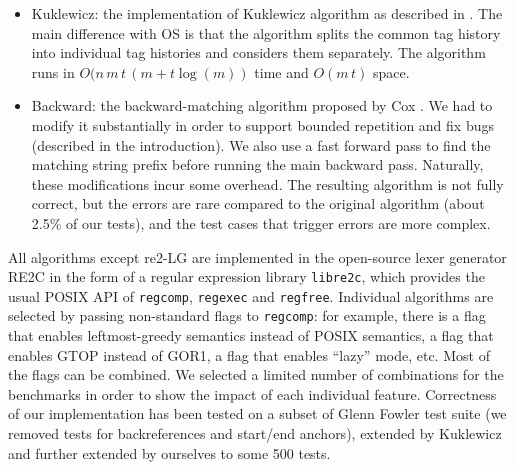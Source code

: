\documentclass[AMA,STIX1COL]{WileyNJD-v2}
\begin{document}
\begin{itemize}[itemsep=0.2em, topsep=0.5em]
\item Kuklewicz: the implementation of Kuklewicz algorithm \cite{Kuk07} as described in \cite{Tro17}.
    The main difference with OS is that the algorithm splits the common tag history into individual tag histories and considers them separately.
    The algorithm runs in $O(n \, m \, t \, (m + t \log(m))$ time and $O(m \, t)$ space.

\item Backward: the backward-matching algorithm proposed by Cox \cite{Cox09}.
    We had to modify it substantially in order to support bounded repetition and fix bugs (described in the introduction).
    We also use a fast forward pass to find the matching string prefix before running the main backward pass.
    Naturally, these modifications incur some overhead.
    The resulting algorithm is not fully correct, but the errors are rare compared to the original algorithm (about 2.5\% of our tests),
    and the test cases that trigger errors are more complex.
\\[-0.5em]
\end{itemize}

All algorithms except re2-LG are implemented in the open-source lexer generator RE2C \cite{RE2C}
in the form of a regular expression library \texttt{libre2c},
which provides the usual POSIX API of \texttt{regcomp}, \texttt{regexec} and \texttt{regfree}.
Individual algorithms are selected by passing non-standard flags to \texttt{regcomp}:
for example, there is a flag that enables leftmost-greedy semantics instead of POSIX semantics,
a flag that enables GTOP instead of GOR1,
a flag that enables ``lazy'' mode, etc.
Most of the flags can be combined.
We selected a limited number of combinations for the benchmarks
in order to show the impact of each individual feature.
Correctness of our implementation has been tested on a subset of Glenn Fowler test suite \cite{Fow03}
(we removed tests for backreferences and start/end anchors),
extended by Kuklewicz and further extended by ourselves to some 500 tests.
\\

 \datatableX
\pgfplotstabletranspose{\datatable}{\datatableX}

\def\plotheight{1.5in}
\def\plotshift{\linewidth/5*3}
\end{document}
